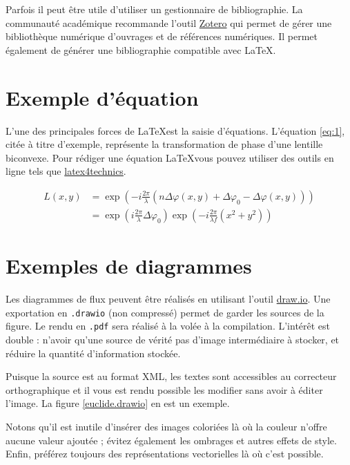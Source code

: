 \documentclass[
    iai, %
    eai, %
]{heig-tb}
\begin{document}
Parfois il peut être utile d'utiliser un gestionnaire de bibliographie. La communauté académique recommande l'outil \href{https://www.zotero.org/}{Zotero} qui permet de gérer une bibliothèque numérique d'ouvrages et de références numériques. Il permet également de générer une bibliographie compatible avec \LaTeX.

\section{Exemple d'équation}
L'une des principales forces de \LaTeX est la saisie d'équations. L'équation \ref{eq:1}, citée à titre d'exemple, représente la transformation de phase d'une lentille biconvexe. Pour rédiger une équation \LaTeX vous pouvez utiliser des outils en ligne tels que \href{https://www.latex4technics.com/}{latex4technics}.

\begin{equation} \label{eq:1}
    \begin{split}
        L(x,y) &= \exp\left( - i\frac{{2\pi }}{\lambda }\left( {n\Delta \varphi (x,y) + \Delta {\varphi _0} - \Delta \varphi (x,y)} \right)\right)\\
        &= {\exp\left({i\frac{{2\pi }}{\lambda }\Delta {\varphi _0}}\right)}{\exp\left({ - i\frac{{2\pi }}{{\lambda f}}({x^2} + {y^2})}\right)}
    \end{split}
\end{equation}

\section{Exemples de diagrammes}

Les diagrammes de flux peuvent être réalisés en utilisant l'outil \href{https://app.diagrams.net/}{draw.io}. Une exportation en \texttt{.drawio} (non compressé) permet de garder les sources de la figure. Le rendu en \texttt{.pdf} sera réalisé à la volée à la compilation. L'intérêt est double : n'avoir qu'une source de vérité \cad pas d'image intermédiaire à stocker, et réduire la quantité d'information stockée.

Puisque la source est au format XML, les textes sont accessibles au correcteur orthographique et il vous est rendu possible les modifier sans avoir à éditer l'image. La figure \ref{euclide.drawio} en est un exemple.


Notons qu'il est inutile d'insérer des images coloriées là où la couleur n'offre aucune valeur ajoutée ; évitez également les ombrages et autres effets de style. Enfin, préférez toujours des représentations vectorielles là où c'est possible.
\end{document}
